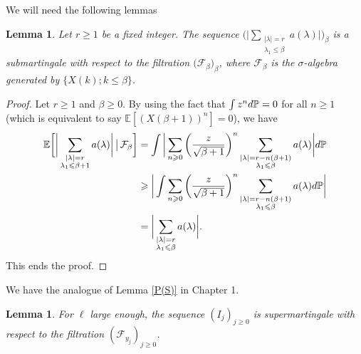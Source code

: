 \documentclass{article}
\newtheorem{lemma}[theorem]{Lemma}
\begin{document}
We will need the following lemmas
\begin{lemma}\label{lemma_surmartingale_chapter_2}
    Let $r\geqslant 1$ be a fixed integer. The sequence $\bigg( \bigg| \sum_{\substack{|\lambda|=r \\ \lambda_1 \leqslant \beta}} a(\lambda)\bigg|\bigg)_{\beta}$ is a submartingale with respect to the filtration $\big(\mathcal{F}_{\beta}\big)_{\beta}$, where $\mathcal{F}_{\beta} $ is the $\sigma$-algebra generated by $\big\{ X(k); k\leqslant \beta \big\}$.
\end{lemma}
\begin{proof}[Proof]
    Let $r\geqslant 1$ and $\beta \geqslant 0$. By using the fact that $\int z^n {\rm d}\mathbb{P}=0$ for all $n\geqslant 1$ (which is equivalent to say $\mathbb{E}[(X(\beta+1))^n]=0$), we have 
    $$
    \begin{aligned}
        \mathbb{E}\bigg[\bigg| \sum_{\substack{|\lambda|=r \\ \lambda_1 \leqslant \beta+1}} a(\lambda)\bigg|  \, \big| \, \mathcal{F}_{\beta}\bigg] & = \int   \bigg|\sum_{n\geqslant 0} \bigg(\frac{z}{\sqrt{\beta+1}}\bigg)^n \sum_{\substack{|\lambda|=r-n(\beta+1) \\ \lambda_1 \leqslant \beta}} a(\lambda)\bigg|  {\rm d}\mathbb{P}
        \\ &  \geqslant \bigg| \int   \sum_{n\geqslant 0} \bigg(\frac{z}{\sqrt{\beta+1}}\bigg)^n \sum_{\substack{|\lambda|=r-n(\beta+1) \\ \lambda_1 \leqslant \beta}} a(\lambda)  {\rm d}\mathbb{P}\bigg|
        \\ & = \bigg| \sum_{\substack{|\lambda|=r \\ \lambda_1 \leqslant \beta}} a(\lambda)\bigg|.
    \end{aligned}
    $$
    This ends the proof.
\end{proof}
\noindent We have the analogue of Lemma \ref{P(S)} in Chapter 1.
\begin{lemma}\label{lemma_I_j_sousmartingale_chap2}
For $\ell$ large enough, the sequence $(I_j)_{j\geqslant 0}$ is supermartingale with respect to the filtration $(\mathcal{F}_{y_j})_{j\geqslant 0}$.
\end{lemma}
\end{document}
